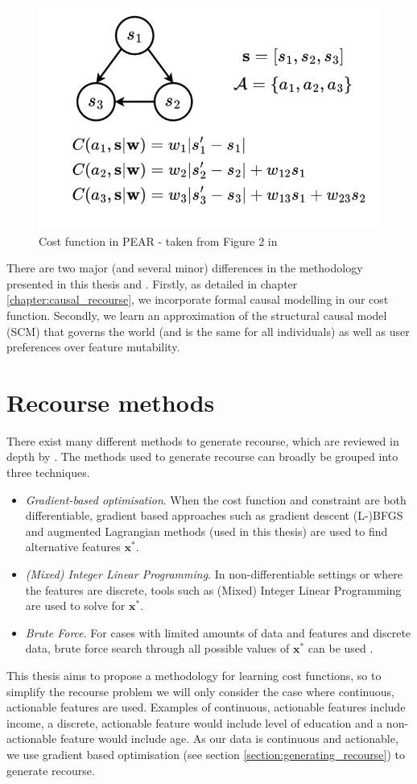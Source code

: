 \begin{figure}[!htb]
	\centering
	\includegraphics[width=0.5\linewidth]{images/detoni_et_al2.png}
	\caption{Cost function in PEAR - taken from Figure 2 in \textcite{detoniPersonalizedAlgorithmicRecourse2023}}
	\label{fig:detoni_et_al2}
\end{figure}

There are two major (and several minor) differences in the methodology presented in this thesis and \textcite{detoniPersonalizedAlgorithmicRecourse2023}. Firstly, as detailed in chapter \ref{chapter:causal_recourse}, we incorporate formal causal modelling \citep{pearl2016causal} in our cost function. Secondly, we learn an approximation of the structural causal model (SCM) that governs the world (and is the same for all individuals) as well as user preferences over feature mutability.


\section{Recourse methods}

There exist many different methods to generate recourse, which are reviewed in depth by \textcite{karimiSurveyAlgorithmicRecourse2022}. The methods used to generate recourse can broadly be grouped into three techniques.

\begin{itemize}
	\item \textit{Gradient-based optimisation}. When the cost function and constraint are both differentiable, gradient based approaches such as gradient descent (L-)BFGS and augmented Lagrangian methods (used in this thesis) are used to find alternative features $\mathbf{x}^*$.
	\item \textit{(Mixed) Integer Linear Programming}. In non-differentiable settings or where the features are discrete, tools such as (Mixed) Integer Linear Programming are used to solve for $\mathbf{x}^*$.
	\item \textit{Brute Force}. For cases with limited amounts of data and features and discrete data, brute force search through all possible values of $\mathbf{x}^*$ can be used \citep{vonkugelgenFairnessCausalAlgorithmic2022}.
\end{itemize}

This thesis aims to propose a methodology for learning cost functions, so to simplify the recourse problem we will only consider the case where continuous, actionable features are used. Examples of continuous, actionable features include income, a discrete, actionable feature would include level of education and a non-actionable feature would include age. As our data is continuous and actionable, we use gradient based optimisation (see section \ref{section:generating_recourse}) to generate recourse.